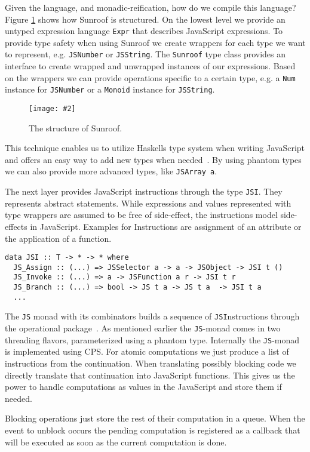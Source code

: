 \documentclass{llncs}
\newcommand{\Src}[1]{{\tt{#1}}}
\newcommand{\Figure}[3]{%
\FigureS{#1}{#2}{#3}{scale=0.55,clip=true,trim=0.45cm 0.45cm 0.45cm 0.45cm}
}
\newcommand{\FigureS}[4]{%
\begin{figure}[h]%
\vspace{-0.5cm}%
\begin{center}%
\texttt{[image: \#2]}%
\vspace{-0.5cm}%
\end{center}%
\caption{#3}%
\label{#1}%
\vspace{-0.5cm}%
\end{figure}%
}
\begin{document}
Given the language, and monadic-reification, how do we  compile this language? 
Figure \ref{fig:structure} shows how Sunroof is structured.
On the lowest level we provide an untyped expression language \Src{Expr}
that describes JavaScript expressions. 
To provide type safety when using Sunroof we create
wrappers for each type we want to represent, e.g. \Src{JSNumber} or \Src{JSString}.
The \Src{Sunroof} type class provides an 
interface to create wrapped and unwrapped
instances of our expressions. Based on the wrappers we can provide 
operations specific to a certain type, e.g. a \Src{Num} instance
for \Src{JSNumber} or a \Src{Monoid} instance for \Src{JSString}.

\Figure%
{fig:structure}%
{../figures/sunroof-structure.pdf}%
{The structure of Sunroof.}%

This technique enables us to utilize  Haskells type system when writing JavaScript
and offers an easy way to add new types when needed~\cite{Svenningsson:12:CombiningEmbedding}.
By using phantom types we can also provide more advanced types,
like \Src{JSArray a}.

The next layer provides JavaScript instructions through the type \Src{JSI}.
They represents abstract statements. While expressions and values
represented with type wrappers are assumed to be free of side-effect,
the instructions model side-effects in JavaScript. Examples for Instructions
are assignment of an attribute or the application of a function.
\begin{verbatim}
data JSI :: T -> * -> * where
  JS_Assign :: (...) => JSSelector a -> a -> JSObject -> JSI t ()
  JS_Invoke :: (...) => a -> JSFunction a r -> JSI t r
  JS_Branch :: (...) => bool -> JS t a -> JS t a  -> JSI t a
  ...
\end{verbatim}
The \Src{JS} monad with its combinators builds a sequence of 
\Src{JSI}nstructions through the operational
package~\cite{Hackage:10:Operational,Apfelmus:10:Operational}.
As mentioned earlier the \Src{JS}-monad comes in two threading flavors, 
parameterized using a phantom type.
Internally the \Src{JS}-monad is implemented using CPS. For atomic
computations we just produce a list of instructions from the continuation. 
When translating possibly blocking code we directly translate that continuation
into JavaScript functions. This gives us the power to handle 
computations as values in the JavaScript and store them if needed.

Blocking operations just store the rest of their computation in a queue.
When the event to unblock occurs the pending computation is registered 
as a callback that will be executed as soon as the current computation
is done.
\end{document}
